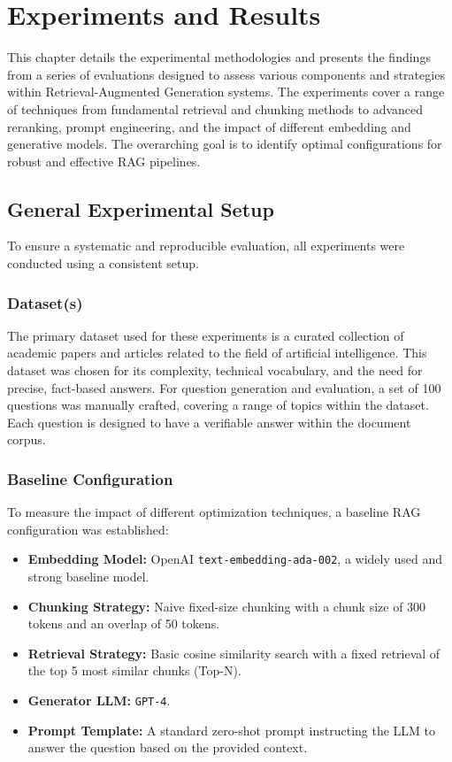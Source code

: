 \chapter{Experiments and Results}
\label{chap:experiments_results}

This chapter details the experimental methodologies and presents the findings from a series of evaluations designed to assess various components and strategies within Retrieval-Augmented Generation systems. The experiments cover a range of techniques from fundamental retrieval and chunking methods to advanced reranking, prompt engineering, and the impact of different embedding and generative models. The overarching goal is to identify optimal configurations for robust and effective RAG pipelines.

\section{General Experimental Setup}
\label{sec:general_setup}
To ensure a systematic and reproducible evaluation, all experiments were conducted using a consistent setup.

\subsection{Dataset(s)}
The primary dataset used for these experiments is a curated collection of academic papers and articles related to the field of artificial intelligence. This dataset was chosen for its complexity, technical vocabulary, and the need for precise, fact-based answers. For question generation and evaluation, a set of 100 questions was manually crafted, covering a range of topics within the dataset. Each question is designed to have a verifiable answer within the document corpus.

\subsection{Baseline Configuration}
To measure the impact of different optimization techniques, a baseline RAG configuration was established:
\begin{itemize}
    \item \textbf{Embedding Model:} OpenAI \texttt{text-embedding-ada-002}, a widely used and strong baseline model.
    \item \textbf{Chunking Strategy:} Naive fixed-size chunking with a chunk size of 300 tokens and an overlap of 50 tokens.
    \item \textbf{Retrieval Strategy:} Basic cosine similarity search with a fixed retrieval of the top 5 most similar chunks (Top-N).
    \item \textbf{Generator LLM:} \texttt{GPT-4}.
    \item \textbf{Prompt Template:} A standard zero-shot prompt instructing the LLM to answer the question based on the provided context.
\end{itemize}

